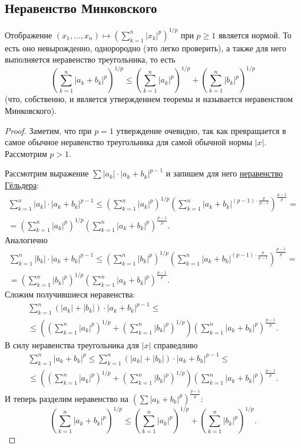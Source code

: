 \subsection{Неравенство Минковского}

\begin{ntheorem}
	Отображение \(\displaystyle (x_1, \ldots, x_n) \mapsto \left(\sum_{k=1}^n |x_k|^p \right)^{1/p}\) при \(p \geqslant 1\) является нормой. То есть оно невырожденно, однорородно (это легко проверить), а также для него выполняется неравенство треугольника, то есть \[
	\left(\sum_{k=1}^n |a_k + b_k|^p \right)^{1/p} \leqslant \left(\sum_{k=1}^n |a_k|^p \right)^{1/p} + \left(\sum_{k=1}^n |b_k|^p \right)^{1/p}
	\]
	(что, собственно, и является утверждением теоремы и называется неравенством Минковского).
\end{ntheorem}
\begin{proof}
	Заметим, что при \(p = 1\) утверждение очевидно, так как превращается в самое обычное неравенство треугольника для самой обычной нормы \(|x|\). Рассмотрим \(p > 1\).
	
	Рассмотрим выражение \(\sum |a_k| \cdot |a_k + b_k|^{p-1}\) и запишем для него \hyperlink{Гёльдер-суммы}{неравенство Гёльдера}:
	\begin{multline*}
		\sum_{k=1}^n |a_k| \cdot |a_k + b_k|^{p-1} \leqslant \left(\sum_{k=1}^n |a_k|^p \right)^{1/p} \left(\sum_{k=1}^n |a_k + b_k|^{(p - 1) \cdot \frac{p}{p-1}} \right)^{\frac{p-1}{p}} = \\
		= \left(\sum_{k=1}^n |a_k|^p \right)^{1/p} \left(\sum_{k=1}^n |a_k + b_k|^p \right)^{\frac{p-1}{p}}.
	\end{multline*}
	Аналогично
	\begin{multline*}
		\sum_{k=1}^n |b_k| \cdot |a_k + b_k|^{p-1} \leqslant \left(\sum_{k=1}^n |b_k|^p \right)^{1/p} \left(\sum_{k=1}^n |a_k + b_k|^{(p - 1) \cdot \frac{p}{p-1}} \right)^{\frac{p-1}{p}} = \\
		= \left(\sum_{k=1}^n |b_k|^p \right)^{1/p} \left(\sum_{k=1}^n |a_k + b_k|^p \right)^{\frac{p-1}{p}}.
	\end{multline*}
	Сложим получившиеся неравенства:
	\begin{multline*}
		\sum_{k=1}^n (|a_k| + |b_k|) \cdot |a_k + b_k|^{p-1} \leqslant \\
		\leqslant \left(\left(\sum_{k=1}^n |a_k|^p \right)^{1/p} + \left(\sum_{k=1}^n |b_k|^p \right)^{1/p} \right) \left(\sum_{k=1}^n |a_k + b_k|^p \right)^{\frac{p-1}{p}}.
	\end{multline*}
	В силу неравенства треугольника для \(|x|\) справедливо 
	\begin{multline*}
		\sum_{k=1}^n |a_k + b_k|^p \leqslant \sum_{k=1}^n (|a_k| + |b_k|) \cdot |a_k + b_k|^{p-1} \leqslant \\
		\leqslant \left(\left(\sum_{k=1}^n |a_k|^p \right)^{1/p} + \left(\sum_{k=1}^n |b_k|^p \right)^{1/p} \right) \left(\sum_{k=1}^n |a_k + b_k|^p \right)^{\frac{p-1}{p}}.
	\end{multline*}
	И теперь разделим неравенство на \((\sum |a_k + b_k|^p)^{\frac{p-1}{p}}\): \[
	\left(\sum_{k=1}^n |a_k + b_k|^p\right)^{1/p} \leqslant \left(\sum_{k=1}^n |a_k|^p \right)^{1/p} + \left(\sum_{k=1}^n |b_k|^p \right)^{1/p}.
	\]
\end{proof}

